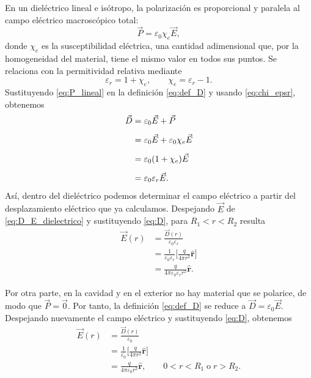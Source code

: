 \documentclass[11pt]{article}
\newcommand{\er}{\hat{\mathbf r}}
\begin{document}
En un dieléctrico lineal e isótropo, la polarización es proporcional
y paralela al campo eléctrico macroscópico total:
\begin{equation}
  \vec P=\varepsilon_0\chi_e\vec E,
  \label{eq:P_lineal}
\end{equation}
donde $\chi_e$ es la susceptibilidad eléctrica, una cantidad
adimensional que, por la homogeneidad del material, tiene el mismo
valor en todos sus puntos. Se relaciona con la permitividad
relativa mediante
\begin{equation}
  \varepsilon_r=1+\chi_e,
  \qquad
  \chi_e=\varepsilon_r-1.
  \label{eq:chi_epsr}
\end{equation}
Sustituyendo \eqref{eq:P_lineal} en la definición
\eqref{eq:def_D} y usando \eqref{eq:chi_epsr}, obtenemos
\begin{align}
  \vec D
    &=\varepsilon_0\vec E+\vec P
      \notag\\[5pt]
    &=\varepsilon_0\vec E
      +\varepsilon_0\chi_e\vec E
      \notag\\[5pt]
    &=\varepsilon_0(1+\chi_e)\vec E
      \notag\\[5pt]
    &=\varepsilon_0\varepsilon_r\vec E.
      \label{eq:D_E_dielectrico}
\end{align}
Así, dentro del dieléctrico podemos determinar el campo eléctrico
a partir del desplazamiento eléctrico que ya calculamos.
Despejando $\vec E$ de \eqref{eq:D_E_dielectrico} y sustituyendo
\eqref{eq:D}, para $R_1<r<R_2$ resulta
\begin{align*}
  \vec E(r)
    &=\frac{\vec D(r)}{\varepsilon_0\varepsilon_r}\\[5pt]
    &=\frac{1}{\varepsilon_0\varepsilon_r}
      \Biggl[\frac{q}{4\pi r^2}\er\Biggr]\\[5pt]
    &=\frac{q}{4\pi\varepsilon_0\varepsilon_r r^2}\er.
\end{align*}

Por otra parte, en la cavidad y en el exterior no hay material
que se polarice, de modo que $\vec P=\vec0$. Por tanto,
la definición \eqref{eq:def_D} se reduce a
$\vec D=\varepsilon_0\vec E$. Despejando nuevamente el campo
eléctrico y sustituyendo \eqref{eq:D}, obtenemos
\begin{align*}
  \vec E(r)
    &=\frac{\vec D(r)}{\varepsilon_0}\\[5pt]
    &=\frac{1}{\varepsilon_0}
      \Biggl[\frac{q}{4\pi r^2}\er\Biggr]\\[5pt]
    &=\frac{q}{4\pi\varepsilon_0r^2}\er,
    \qquad 0<r<R_1 \;\text{o}\; r>R_2.
\end{align*}
\end{document}
